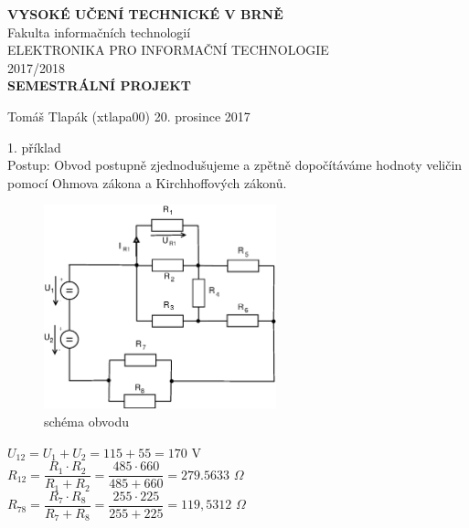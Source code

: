 \documentclass[10pt,a4paper]{article}
\begin{document}
    \begin{center}
       {\Large \textbf{VYSOKÉ UČENÍ TECHNICKÉ V BRNĚ}}
       \\[18pt]
       {\huge  Fakulta informačních technologií}
       \\[220pt]
       {\LARGE  ELEKTRONIKA PRO INFORMAČNÍ TECHNOLOGIE}
       \\[20pt]
       {\LARGE  2017/2018}
       \\[40pt]
       {\LARGE \textbf{ SEMESTRÁLNÍ PROJEKT}}
       \\[320pt]
    \end{center}
    
    \begin{flushleft}
        \begin{large}
         Tomáš Tlapák (xtlapa00) \hfill  20. prosince 2017
        \end{large}
    \end{flushleft}
   
   \begin{flushleft}
    {\large 1. příklad}
    \\[10pt]
    Postup: Obvod postupně zjednodušujeme a zpětně dopočítáváme hodnoty veličin pomocí Ohmova zákona a Kirchhoffových zákonů.
    \\[15pt]
   \end{flushleft}
   
   \begin{figure}[ht]
    \begin{center}
     \includegraphics[width=0.6\textwidth]{2017.eps}
     \caption{schéma obvodu}
    \end{center}
   \end{figure}
  
   \begin{center}
    \begin{large}
      $ U_{12} = U_1 + U_2 = 115 + 55 = 170$ V \\[6pt]
      $ R_{12} = \dfrac{R_1 \cdot {R_2}}{R_1  +R_2} = \dfrac{485\cdot 660}{485+660} = 279.5633 $ $\Omega$ \\[6pt]
      $ R_{78} = \dfrac{R_7 \cdot {R_8}}{R_7 + R_8} = \dfrac{255\cdot 225}{255 + 225} = 119,5312 $ $\Omega$ \\[20pt]
    \end{large}
   \end{center}
  
\end{document}
